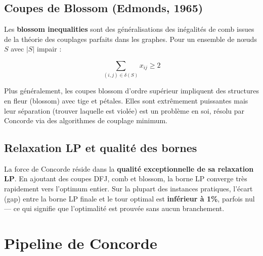 \documentclass[12pt, a4paper]{article}
\begin{document}
\subsection{Coupes de Blossom (Edmonds, 1965)}

Les \textbf{blossom inequalities} sont des généralisations des inégalités de
comb issues de la théorie des couplages parfaits dans les graphes. Pour un
ensemble de nœuds $S$ avec $|S|$ impair :

\begin{equation}
  \sum_{(i,j) \in \delta(S)} x_{ij} \geq 2
  \label{eq:blossom}
\end{equation}

Plus généralement, les coupes blossom d'ordre supérieur impliquent des
structures en fleur (blossom) avec tige et pétales. Elles sont extrêmement
puissantes mais leur séparation (trouver laquelle est violée) est un problème
en soi, résolu par Concorde via des algorithmes de couplage minimum.

\subsection{Relaxation LP et qualité des bornes}

La force de Concorde réside dans la \textbf{qualité exceptionnelle de sa
relaxation LP}. En ajoutant des coupes DFJ, comb et blossom, la borne LP
converge très rapidement vers l'optimum entier. Sur la plupart des instances
pratiques, l'écart (gap) entre la borne LP finale et le tour optimal est
\textbf{inférieur à 1\%}, parfois nul --- ce qui signifie que l'optimalité
est prouvée sans aucun branchement.

\section{Pipeline de Concorde}
\end{document}
